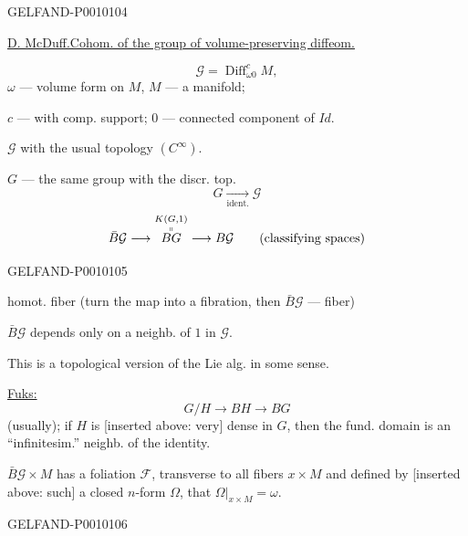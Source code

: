 \begin{GelfandAdjacentEvidence}{GELFAND-P001010}{4}

\underline{D. McDuff.}\qquad \underline{Cohom. of the group of volume-preserving diffeom.}

\[
\mathcal G=\operatorname{Diff}_{\omega 0}^{c}M,
\]
$\omega$ --- volume form on $M$, $M$ --- a manifold;

$c$ --- with comp. support; $0$ --- connected component of $Id$.

$\mathcal G$ with the usual topology $(C^\infty)$.

$G$ --- the same group with the discr. top.
\[
G\underset{\text{ident.}}{\longrightarrow}\mathcal G
\]
\[
\bar B\mathcal G\longrightarrow
\overset{\substack{K(G,1)\\\shortparallel}}{BG}
\longrightarrow B\mathcal G
\qquad (\text{classifying spaces})
\]
\end{GelfandAdjacentEvidence}
\begin{GelfandAdjacentEvidence}{GELFAND-P001010}{5}

homot. fiber (turn the map into a fibration, then $\bar B\mathcal G$ --- fiber)

$\bar B\mathcal G$ depends only on a neighb. of $1$ in $\mathcal G$.

This is a topological version of the Lie alg. in some sense.

\underline{Fuks:}
\[
G/H\longrightarrow BH\longrightarrow BG
\]
(usually); if $H$ is [inserted above: very] dense in $G$, then the fund. domain is an “infinitesim.” neighb. of the identity.

$\bar B\mathcal G\times M$ has a foliation $\mathcal F$,
transverse to all fibers $x\times M$
and defined by [inserted above: such] a closed $n$-form $\Omega$, that $\Omega|_{x\times M}=\omega$.
\end{GelfandAdjacentEvidence}
\begin{GelfandAdjacentEvidence}{GELFAND-P001010}{6}


\end{GelfandAdjacentEvidence}
